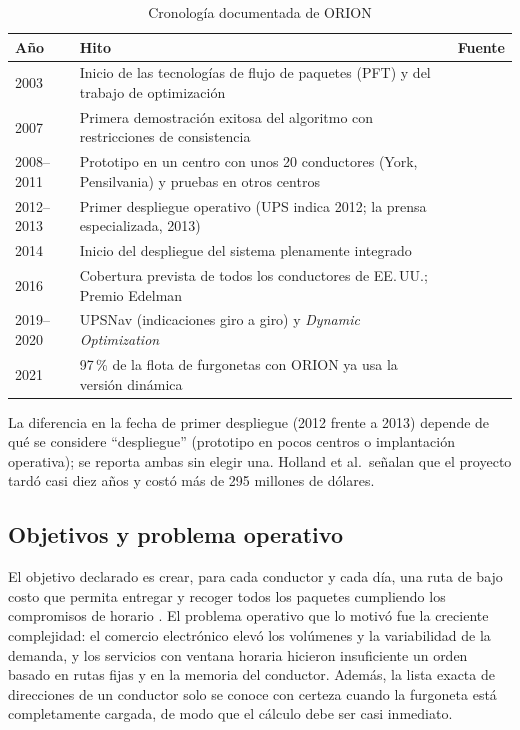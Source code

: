 \documentclass[11pt,a4paper]{article}
\begin{document}
\begin{table}[ht]
\centering\small
\caption{Cronología documentada de ORION}
\label{tab:cronologia}
\begin{tabularx}{\textwidth}{@{}l X l@{}}
\toprule
Año & Hito & Fuente \\
\midrule
2003 & Inicio de las tecnologías de flujo de paquetes (PFT) y del trabajo de optimización & \textcite{holland2017} \\
2007 & Primera demostración exitosa del algoritmo con restricciones de consistencia & \textcite{holland2017} \\
2008--2011 & Prototipo en un centro con unos 20 conductores (York, Pensilvania) y pruebas en otros centros & \textcite{holland2017,leonard2021} \\
2012--2013 & Primer despliegue operativo (UPS indica 2012; la prensa especializada, 2013) & \textcite{ups2020,clevenger2016} \\
2014 & Inicio del despliegue del sistema plenamente integrado & \textcite{holland2017} \\
2016 & Cobertura prevista de todos los conductores de EE.\,UU.; Premio Edelman & \textcite{holland2017} \\
2019--2020 & UPSNav (indicaciones giro a giro) y \emph{Dynamic Optimization} & \textcite{ups2020} \\
2021 & 97\,\% de la flota de furgonetas con ORION ya usa la versión dinámica & \textcite{leonard2021} \\
\bottomrule
\end{tabularx}
\end{table}

La diferencia en la fecha de primer despliegue (2012 frente a 2013) depende de qué se considere ``despliegue'' (prototipo en pocos centros o implantación operativa); se reporta ambas sin elegir una. Holland et al.\ señalan que el proyecto tardó casi diez años y costó más de 295 millones de dólares.

\subsection{Objetivos y problema operativo}
El objetivo declarado es crear, para cada conductor y cada día, una ruta de bajo costo que permita entregar y recoger todos los paquetes cumpliendo los compromisos de horario \parencite{holland2017}. El problema operativo que lo motivó fue la creciente complejidad: el comercio electrónico elevó los volúmenes y la variabilidad de la demanda, y los servicios con ventana horaria hicieron insuficiente un orden basado en rutas fijas y en la memoria del conductor. Además, la lista exacta de direcciones de un conductor solo se conoce con certeza cuando la furgoneta está completamente cargada, de modo que el cálculo debe ser casi inmediato.
\end{document}
